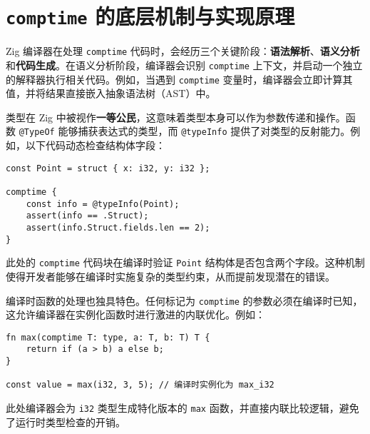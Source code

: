 \chapter{\texttt{comptime} 的底层机制与实现原理}
Zig 编译器在处理 \verb!comptime! 代码时，会经历三个关键阶段：\textbf{语法解析}、\textbf{语义分析}和\textbf{代码生成}。在语义分析阶段，编译器会识别 \verb!comptime! 上下文，并启动一个独立的解释器执行相关代码。例如，当遇到 \verb!comptime! 变量时，编译器会立即计算其值，并将结果直接嵌入抽象语法树（AST）中。\par
类型在 Zig 中被视作\textbf{一等公民}，这意味着类型本身可以作为参数传递和操作。函数 \verb!@TypeOf! 能够捕获表达式的类型，而 \verb!@typeInfo! 提供了对类型的反射能力。例如，以下代码动态检查结构体字段：\par
\begin{lstlisting}[language=zig]
const Point = struct { x: i32, y: i32 };

comptime {
    const info = @typeInfo(Point);
    assert(info == .Struct);
    assert(info.Struct.fields.len == 2);
}
\end{lstlisting}
此处的 \verb!comptime! 代码块在编译时验证 \verb!Point! 结构体是否包含两个字段。这种机制使得开发者能够在编译时实施复杂的类型约束，从而提前发现潜在的错误。\par
编译时函数的处理也独具特色。任何标记为 \verb!comptime! 的参数必须在编译时已知，这允许编译器在实例化函数时进行激进的内联优化。例如：\par
\begin{lstlisting}[language=zig]
fn max(comptime T: type, a: T, b: T) T {
    return if (a > b) a else b;
}

const value = max(i32, 3, 5); // 编译时实例化为 max_i32
\end{lstlisting}
此处编译器会为 \verb!i32! 类型生成特化版本的 \verb!max! 函数，并直接内联比较逻辑，避免了运行时类型检查的开销。\par
